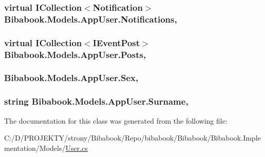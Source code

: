 \subsubsection[{Notifications}]{\setlength{\rightskip}{0pt plus 5cm}virtual I\+Collection$<${\bf Notification}$>$ Bibabook.\+Models.\+App\+User.\+Notifications\hspace{0.3cm}{\ttfamily [get]}, {\ttfamily [set]}}\label{class_bibabook_1_1_models_1_1_app_user_ae6b3d722c91df8dca88d2559d52ea6f4}
\hypertarget{class_bibabook_1_1_models_1_1_app_user_a84be3b79076df57e90c2f46086ba16d7}{}
\subsubsection[{Posts}]{\setlength{\rightskip}{0pt plus 5cm}virtual I\+Collection$<${\bf I\+Event\+Post}$>$ Bibabook.\+Models.\+App\+User.\+Posts\hspace{0.3cm}{\ttfamily [get]}, {\ttfamily [set]}}\label{class_bibabook_1_1_models_1_1_app_user_a84be3b79076df57e90c2f46086ba16d7}
\hypertarget{class_bibabook_1_1_models_1_1_app_user_a2130ea655fc647a8331fe0d17bc48808}{}
\subsubsection[{Sex}]{ Bibabook.\+Models.\+App\+User.\+Sex\hspace{0.3cm}{\ttfamily [get]}, {\ttfamily [set]}}\label{class_bibabook_1_1_models_1_1_app_user_a2130ea655fc647a8331fe0d17bc48808}
\hypertarget{class_bibabook_1_1_models_1_1_app_user_aac165e3467b1c5ac86c5c4972107f952}{}
\subsubsection[{Surname}]{\setlength{\rightskip}{0pt plus 5cm}string Bibabook.\+Models.\+App\+User.\+Surname\hspace{0.3cm}{\ttfamily [get]}, {\ttfamily [set]}}\label{class_bibabook_1_1_models_1_1_app_user_aac165e3467b1c5ac86c5c4972107f952}


The documentation for this class was generated from the following file\+:\begin{DoxyCompactItemize}
\item 
C\+:/\+D/\+P\+R\+O\+J\+E\+K\+T\+Y/strony/\+Bibabook/\+Repo/bibabook/\+Bibabook/\+Bibabook.\+Implementation/\+Models/\hyperlink{_user_8cs}{User.\+cs}\end{DoxyCompactItemize}
